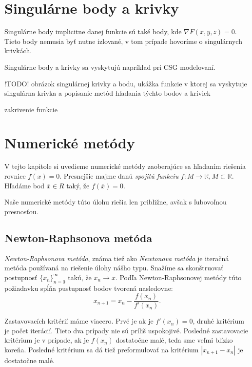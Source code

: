 \newpage

\section{Singulárne body a krivky}

Singulárne body implicitne danej funkcie sú také body, kde $\nabla F(x, y, z) = 0$. Tieto body nemusia byť nutne izlované, 
v tom prípade hovoríme o singulárnych krivkách. 

Singulárne body a krivky sa vyskytujú napríklad pri CSG modelovaní.

\medskip

!TODO! obrázok singulárnej krivky a bodu, ukážka funkcie v ktorej sa vyskytuje singulárna 
krivka a popísanie metód hľadania týchto bodov a kriviek

\medskip

zakrivenie funkcie

\newpage

\section{Numerické metódy}

V tejto kapitole si uvedieme numerické metódy zaoberajúce sa hľadaním riešenia rovnice $f(x) = 0$.
Presnejšie majme danú \textit{spojitú funkciu} $f: M \to \mathbb{R}, M \subset \mathbb{R}$. Hľadáme bod
$\bar{x} \in R$ taký, že $f(\bar{x}) = 0$.

Naše numerické metódy túto úlohu riešia len približne, avšak s ľubovoľnou presnosťou.

\subsection{Newton-Raphsonova metóda}

\textit{Newton-Raphsonova metóda}, známa tiež ako \textit{Newtonova metóda} je iteračná metóda používaná na riešenie
úlohy nášho typu. Snažíme sa skonštruovať postupnosť $\{x_n\}_{n=0}^\infty$ takú, že $x_n \to \bar{x}$.
Podľa Newton-Raphsonovej metódy túto požiadavku spĺňa pustupnosť bodov tvorená nasledovne: 
$$ x_{n+1} = x_n - \frac{f(x_n)}{f'(x_n)}.$$

Zastavovacích kritérií máme viacero. Prvé je ak je $f'(x_n) = 0$, druhé kritérium je počet iterácií. Tieto 
dva prípady nie sú príliš uspokojivé. Posledné zastavovacie kritérium je v prípade, ak je $f(x_n)$ dostatočne 
malé, teda sme veľmi blízko koreňa. Posledné kritérium sa dá tiež preformulovať na kritérium $|x_{n+1} - x_n|$ 
je dostatočne malé.

